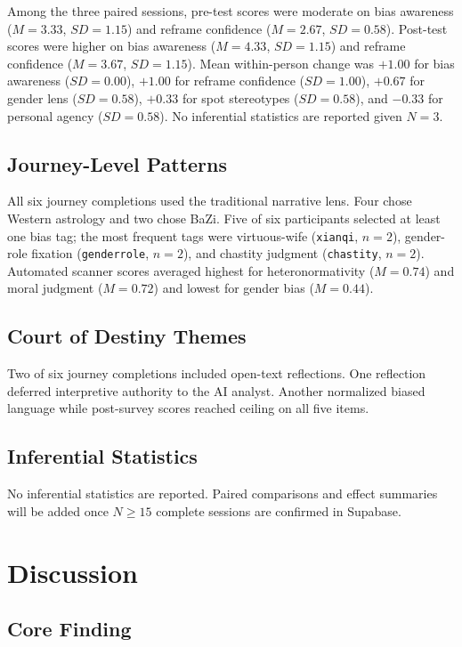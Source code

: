 \documentclass[stu,12pt,floatsintext]{apa7}
\begin{document}
Among the three paired sessions, pre-test scores were moderate on bias awareness ($M = 3.33$, $SD = 1.15$) and reframe confidence ($M = 2.67$, $SD = 0.58$). Post-test scores were higher on bias awareness ($M = 4.33$, $SD = 1.15$) and reframe confidence ($M = 3.67$, $SD = 1.15$). Mean within-person change was $+1.00$ for bias awareness ($SD = 0.00$), $+1.00$ for reframe confidence ($SD = 1.00$), $+0.67$ for gender lens ($SD = 0.58$), $+0.33$ for spot stereotypes ($SD = 0.58$), and $-0.33$ for personal agency ($SD = 0.58$). No inferential statistics are reported given $N = 3$.

\subsection{Journey-Level Patterns}

All six journey completions used the traditional narrative lens. Four chose Western astrology and two chose BaZi. Five of six participants selected at least one bias tag; the most frequent tags were virtuous-wife (\texttt{xianqi}, $n = 2$), gender-role fixation (\texttt{genderrole}, $n = 2$), and chastity judgment (\texttt{chastity}, $n = 2$). Automated scanner scores averaged highest for heteronormativity ($M = 0.74$) and moral judgment ($M = 0.72$) and lowest for gender bias ($M = 0.44$).

\subsection{Court of Destiny Themes}

Two of six journey completions included open-text reflections. One reflection deferred interpretive authority to the AI analyst. Another normalized biased language while post-survey scores reached ceiling on all five items.

\subsection{Inferential Statistics}

No inferential statistics are reported. Paired comparisons and effect summaries will be added once $N \geq 15$ complete sessions are confirmed in Supabase.

\section{Discussion}

\subsection{Core Finding}
\end{document}
